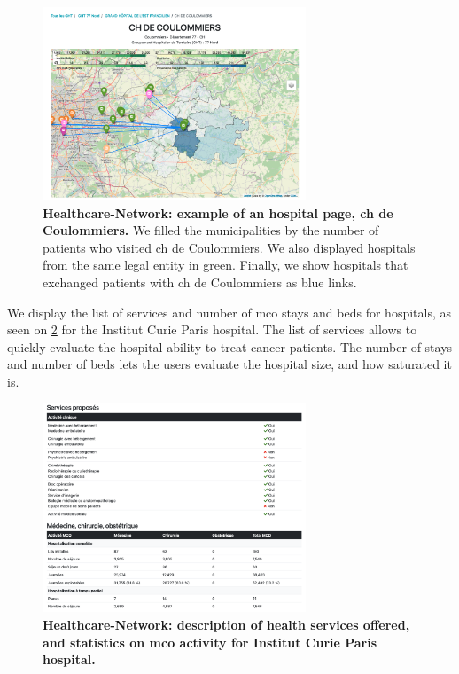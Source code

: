 \begin{figure}[H]
    \includegraphics[width=0.7\textwidth]{images/healthcare-network/coulommiers-co-occ.png}
    \centering
    \caption{
        \textbf{Healthcare-Network: example of an hospital page, \acf{ch} de Coulommiers.} We filled the municipalities by the number of patients who visited \ac{ch} de Coulommiers. We also displayed hospitals from the same legal entity in green. Finally, we show hospitals that exchanged patients with \ac{ch} de Coulommiers as blue links.
    }
    \label{fig:hn-coulommiers-co-occ}
\end{figure}

We display the list of services and number of \ac{mco} stays and beds for hospitals, as seen on \cref{fig:hn-curie-services} for the Institut Curie Paris hospital. The list of services allows to quickly evaluate the hospital ability to treat cancer patients. The number of stays and number of beds lets the users evaluate the hospital size, and how saturated it is.

\begin{figure}[H]
    \includegraphics[width=0.7\textwidth]{images/healthcare-network/curie-services.png}
    \centering
    \caption{
        \textbf{Healthcare-Network: description of health services offered, and statistics on \ac{mco} activity for Institut Curie Paris hospital.}
    }
    \label{fig:hn-curie-services}
\end{figure}

